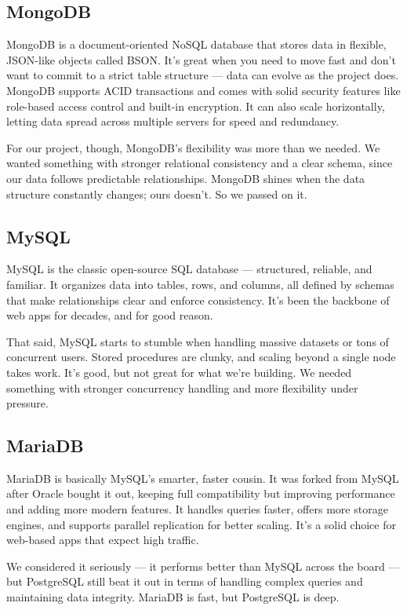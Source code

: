 \documentclass[12pt]{article}
\begin{document}
\subsection{MongoDB}
MongoDB is a document-oriented NoSQL database that stores data in flexible, JSON-like objects called BSON. It’s great when you need to move fast and don’t want to commit to a strict table structure — data can evolve as the project does. MongoDB supports ACID transactions and comes with solid security features like role-based access control and built-in encryption. It can also scale horizontally, letting data spread across multiple servers for speed and redundancy.

For our project, though, MongoDB’s flexibility was more than we needed. We wanted something with stronger relational consistency and a clear schema, since our data follows predictable relationships. MongoDB shines when the data structure constantly changes; ours doesn’t. So we passed on it.

\subsection{MySQL}
MySQL is the classic open-source SQL database — structured, reliable, and familiar. It organizes data into tables, rows, and columns, all defined by schemas that make relationships clear and enforce consistency. It’s been the backbone of web apps for decades, and for good reason.

That said, MySQL starts to stumble when handling massive datasets or tons of concurrent users. Stored procedures are clunky, and scaling beyond a single node takes work. It’s good, but not great for what we’re building. We needed something with stronger concurrency handling and more flexibility under pressure.

\subsection{MariaDB}
MariaDB is basically MySQL’s smarter, faster cousin. It was forked from MySQL after Oracle bought it out, keeping full compatibility but improving performance and adding more modern features. It handles queries faster, offers more storage engines, and supports parallel replication for better scaling. It’s a solid choice for web-based apps that expect high traffic.

We considered it seriously — it performs better than MySQL across the board — but PostgreSQL still beat it out in terms of handling complex queries and maintaining data integrity. MariaDB is fast, but PostgreSQL is deep.
\end{document}
